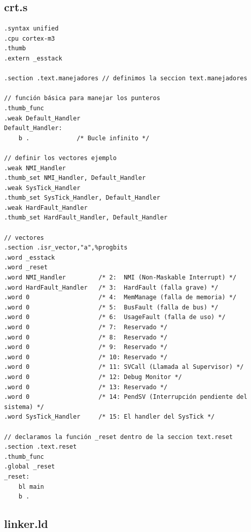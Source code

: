 \subsection{crt.s}
\begin{lstlisting}[language=ARMasm]
.syntax unified 
.cpu cortex-m3
.thumb
.extern _esstack

.section .text.manejadores // definimos la seccion text.manejadores 

// función básica para manejar los punteros 
.thumb_func 
.weak Default_Handler
Default_Handler:
    b .             /* Bucle infinito */

// definir los vectores ejemplo
.weak NMI_Handler
.thumb_set NMI_Handler, Default_Handler
.weak SysTick_Handler
.thumb_set SysTick_Handler, Default_Handler
.weak HardFault_Handler
.thumb_set HardFault_Handler, Default_Handler

// vectores 
.section .isr_vector,"a",%progbits
.word _esstack
.word _reset
.word NMI_Handler         /* 2:  NMI (Non-Maskable Interrupt) */
.word HardFault_Handler   /* 3:  HardFault (falla grave) */
.word 0                   /* 4:  MemManage (falla de memoria) */
.word 0                   /* 5:  BusFault (falla de bus) */
.word 0                   /* 6:  UsageFault (falla de uso) */
.word 0                   /* 7:  Reservado */
.word 0                   /* 8:  Reservado */
.word 0                   /* 9:  Reservado */
.word 0                   /* 10: Reservado */
.word 0                   /* 11: SVCall (Llamada al Supervisor) */
.word 0                   /* 12: Debug Monitor */
.word 0                   /* 13: Reservado */
.word 0                   /* 14: PendSV (Interrupción pendiente del sistema) */
.word SysTick_Handler     /* 15: El handler del SysTick */

// declaramos la función _reset dentro de la seccion text.reset
.section .text.reset
.thumb_func
.global _reset
_reset:
    bl main
    b .
\end{lstlisting}
\subsection{linker.ld}

